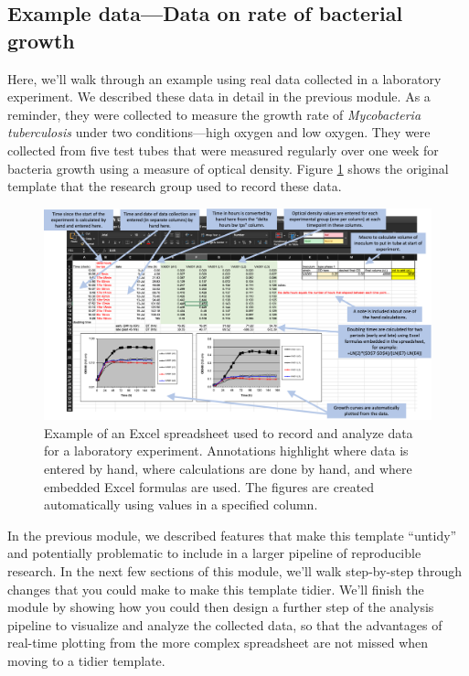 \documentclass[]{tufte-book}
\begin{document}
\subsection{Example data---Data on rate of bacterial growth}\label{example-datadata-on-rate-of-bacterial-growth}

Here, we'll walk through an example using real data collected in a laboratory
experiment. We described these data in detail in the previous module. As a
reminder, they were collected to measure the growth rate of \emph{Mycobacteria
tuberculosis} under two conditions---high oxygen and low oxygen. They were
collected from five test tubes that were measured regularly over one week for
bacteria growth using a measure of optical density. Figure
\ref{fig:growthexcel2} shows the original template that the research group used
to record these data.

\begin{figure}
\includegraphics[width=\textwidth]{figures/growth_curve_example} \caption[Example of an Excel spreadsheet used to record and analyze data for a laboratory experiment]{Example of an Excel spreadsheet used to record and analyze data for a laboratory experiment. Annotations highlight where data is entered by hand, where calculations are done by hand, and where embedded Excel formulas are used. The figures are created automatically using values in a specified column.}\label{fig:growthexcel2}
\end{figure}

In the previous module, we described features that make this template ``untidy''
and potentially problematic to include in a larger pipeline of reproducible
research. In the next few sections of this module, we'll walk step-by-step
through changes that you could make to make this template tidier. We'll finish
the module by showing how you could then design a further step of the
analysis pipeline to visualize and analyze the collected data, so that the
advantages of real-time plotting from the more complex spreadsheet are not
missed when moving to a tidier template.
\end{document}
